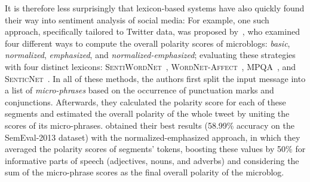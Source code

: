 
It is therefore less surprisingly that lexicon-based systems have also
quickly found their way into sentiment analysis of social media: For
example, one such approach, specifically tailored to Twitter data, was
proposed by~\citet{Musto:14}, who examined four different ways to
compute the overall polarity scores of microblogs: \emph{basic},
\emph{normalized}, \emph{emphasized}, and
\emph{normalized-emphasized}; evaluating these strategies with four
distinct lexicons: \textsc{Sen\-ti\-Word\-Net}~\cite{Esuli:06c},
\textsc{Word\-Net-\-Affect}~\cite{Strapparava:04},
\textsc{MPQA}~\cite{Wiebe:05}, and
\textsc{SenticNet}~\cite{Cambria:14}.  In all of these methods, the
authors first split the input message into a list of
\emph{micro-phrases} based on the occurrence of punctuation marks and
conjunctions.  Afterwards, they calculated the polarity score for each
of these segments and estimated the overall polarity of the whole
tweet by uniting the scores of its micro-phrases.
\citeauthor{Musto:14} obtained their best results (58.99\% accuracy on
the SemEval-2013 dataset) with the normalized-emphasized approach, in
which they averaged the polarity scores of segments' tokens, boosting
these values by 50\% for informative parts of speech (adjectives,
nouns, and adverbs) and considering the sum of the micro-phrase scores
as the final overall polarity of the microblog.


